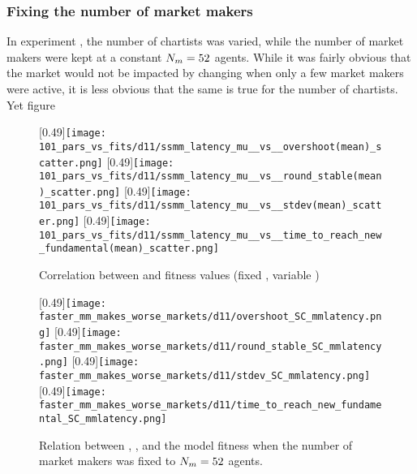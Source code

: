 \subsubsection{Fixing the number of market makers}
In experiment \deleven, the number of chartists was varied, while the number of market makers were kept at a constant $N_{m} = 52$ agents. While it was fairly obvious that the market would not be impacted by changing \ssmmlatencymu when only a few market makers were active, it is less obvious that the same is true for the number of chartists. Yet figure 

\begin{figure}
	\centering
	[0.49\linewidth]{\texttt{[image: 101\_pars\_vs\_fits/d11/ssmm\_latency\_mu\_\_vs\_\_overshoot(mean)\_scatter.png]}}
	[0.49\linewidth]{\texttt{[image: 101\_pars\_vs\_fits/d11/ssmm\_latency\_mu\_\_vs\_\_round\_stable(mean)\_scatter.png]}}
	[0.49\linewidth]{\texttt{[image: 101\_pars\_vs\_fits/d11/ssmm\_latency\_mu\_\_vs\_\_stdev(mean)\_scatter.png]}}
	[0.49\linewidth]{\texttt{[image: 101\_pars\_vs\_fits/d11/ssmm\_latency\_mu\_\_vs\_\_time\_to\_reach\_new\_fundamental(mean)\_scatter.png]}}
	\caption{Correlation between \ssmmlatencymu{} and fitness values (fixed \ssmmnAgents, variable \scnAgents)}
	\label{fig:d11_parvfit_ssmmlatencymu}
\end{figure}


\begin{figure}
     \centering
     \subcaptionbox{}
     [0.49\linewidth]{\texttt{[image: faster\_mm\_makes\_worse\_markets/d11/overshoot\_SC\_mmlatency.png]}}
     \subcaptionbox{}
     [0.49\linewidth]{\texttt{[image: faster\_mm\_makes\_worse\_markets/d11/round\_stable\_SC\_mmlatency.png]}}
     \subcaptionbox{}
     [0.49\linewidth]{\texttt{[image: faster\_mm\_makes\_worse\_markets/d11/stdev\_SC\_mmlatency.png]}}
     \subcaptionbox{}
     [0.49\linewidth]{\texttt{[image: faster\_mm\_makes\_worse\_markets/d11/time\_to\_reach\_new\_fundamental\_SC\_mmlatency.png]}}
     \caption{Relation between \ssmmnAgents, \ssmmlatencymu, and the model fitness when the number of market makers was fixed to $N_{m} = 52$ agents.}
     \label{fig:faster_mm_makes_worse_markets/d11/SC_mmlatency}
\end{figure}


